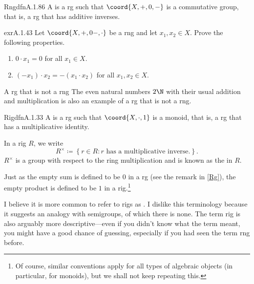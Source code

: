 \begin{dfn}{Rng}{dfnA.1.86}
A  is a rg such that $\coord{X,+,0,-}$ is a commutative group, that is, a rg that has additive inverses.
\end{dfn}
\begin{exr}{}{exrA.1.43}
Let $\coord{X,+,0-,\cdot}$ be a rng and let $x_1,x_2\in X$.  Prove the following properties.
\begin{enumerate}
\item $0\cdot x_1=0$ for all $x_1\in X$.
\item $(-x_1)\cdot x_2=-(x_1\cdot x_2)$ for all $x_1,x_2\in X$.
\end{enumerate}
\end{exr}
\begin{exm}{A rg that is not a rng}{}
The even natural numbers $2\N$ with their usual addition and multiplication is also an example of a rg that is not a rng.
\end{exm}
\begin{dfn}{Rig}{dfnA.1.33}
A  is a rg such that $\coord{X,\cdot ,1}$ is a monoid, that is, a rg that has a multiplicative identity.
\begin{rmk}
In a rig $R$, we write
{\scriptsize
\begin{equation}\label{eqnA.1.34}
R^{\times}\coloneqq \left\{ r\in R:r\text{ has a multiplicative inverse.}\right\} .
\end{equation}
}
$R^{\times}$ is a group with respect to the ring multiplication and is known as the  in $R$.
\end{rmk}
\begin{rmk}
Just as the empty sum is defined to be $0$ in a rg (see the remark in \cref{Rg}), the empty product is defined to be $1$ in a rig.\footnote{Of course, similar conventions apply for all types of algebraic objects (in particular, for monoids), but we shall not keep repeating this.}
\end{rmk}
\begin{rmk}
I believe it is more common to refer to rigs as .  I dislike this terminology because it suggests an analogy with semigroups, of which there is none.  The term rig is also arguably more descriptive---even if you didn't know what the term meant, you might have a good chance of guessing, especially if you had seen the term rng before.
\end{rmk}
\end{dfn}
